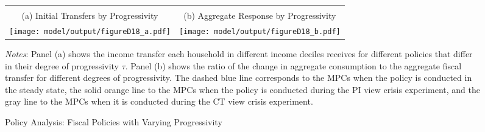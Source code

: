 \documentclass[12pt]{article}
\begin{document}
\begin{spacing}{1.5}
\begin{figure}[H]
\caption{Policy Analysis: Fiscal Policies with Varying Progressivity}
\label{fig: policy2}
\begin{tabular}{cc}
\vspace{-.5em} \\
(a) Initial Transfers by Progressivity & (b) Aggregate Response by Progressivity \\
 \texttt{[image: model/output/figureD18\_a.pdf]} &
 \texttt{[image: model/output/figureD18\_b.pdf]} \\
\end{tabular}
\flushleft\raggedright{}\textit{\footnotesize{}Notes}{: \footnotesize{Panel (a) shows the income transfer each  household in different income deciles receives for different policies that differ in their degree of progressivity $\tau$. Panel (b) shows the ratio of the change in aggregate consumption to the aggregate fiscal transfer for different degrees of progressivity. The dashed blue line corresponds to the MPCs when the policy is conducted in the steady state, the solid orange line to the MPCs when the policy is conducted during the PI view crisis experiment, and the gray line to the MPCs when it is conducted during the CT view crisis experiment.
}}{\footnotesize\par}
\end{figure}


\end{spacing}
\end{document}
